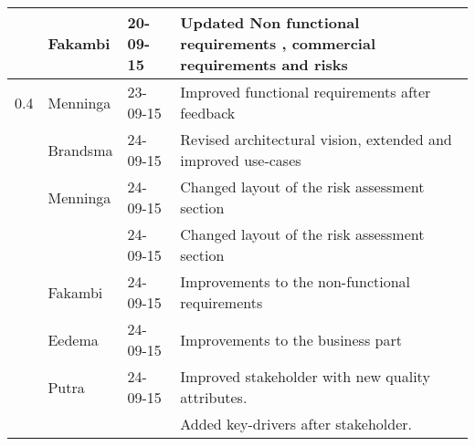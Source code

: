 \begin{longtable}{L{} L{} L{} L{}}
	                \\ & Fakambi             & 20-09-15     & Updated Non functional requirements , commercial requirements and risks \\
	\midrule
			
	0.4              & Menninga              & 23-09-15      & Improved functional requirements after feedback                                                                                                                                                                            \\
	                 & Brandsma              & 24-09-15      & Revised architectural vision, extended and improved use-cases                                                                                                                                                              \\
	                 & Menninga              & 24-09-15      & Changed layout of the risk assessment section                                                                                                                                                                              \\
	                 &                       & 24-09-15      & Changed layout of the risk assessment section                                                                                                                                                                              \\
	                 & Fakambi               & 24-09-15      & Improvements to the non-functional requirements                                                                                                                                                                            \\
	                 & Eedema                & 24-09-15      & Improvements to the business part                                                                                                                                                                                          \\
	                 & Putra                 & 24-09-15      & Improved stakeholder with new quality attributes.                                                                                                                                                                          \\
	                 &                       &               & Added key-drivers after stakeholder.                                                                                                                                                                                       \\

\end{longtable}
